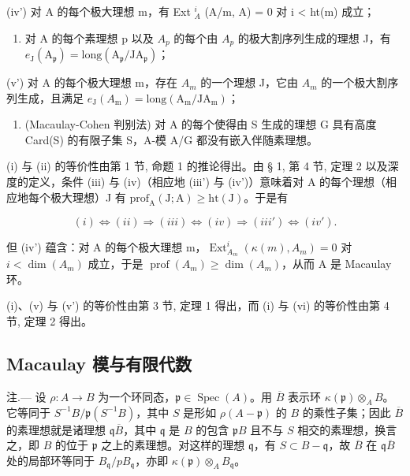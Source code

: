 (iv') 对 A 的每个极大理想 m，有 Ext \(_{A}^{i}\) (A/m, A) = 0 对 i \textless{} ht(m) 成立；

\begin{enumerate}
\def\labelenumi{(\alph{enumi})}
\setcounter{enumi}{21}
\tightlist
\item
  对 A 的每个素理想 p 以及 \(A_{p}\) 的每个由 \(A_{p}\) 的极大割序列生成的理想 J，有 \(e_{\mathrm{J}}(\mathrm{A}_{\mathfrak{p}})=\mathrm{long}(\mathrm{A}_{\mathfrak{p}}/\mathrm{JA}_{\mathfrak{p}})\)；
\end{enumerate}

(v') 对 A 的每个极大理想 m，存在 \(A_{m}\) 的一个理想 J，它由 \(A_{m}\) 的一个极大割序列生成，且满足 \(e_{\mathrm{J}}(A_{\mathrm{m}})=\mathrm{long}(\mathrm{A}_{\mathrm{m}}/\mathrm{JA}_{\mathrm{m}})\)；

\begin{enumerate}
\def\labelenumi{(\roman{enumi})}
\setcounter{enumi}{5}
\tightlist
\item
  (Macaulay-Cohen 判别法) 对 A 的每个使得由 S 生成的理想 G 具有高度 Card(S) 的有限子集 S，A-模 A/G 都没有嵌入伴随素理想。
\end{enumerate}

(i) 与 (ii) 的等价性由第 1 节, 命题 1 的推论得出。由 § 1, 第 4 节, 定理 2 以及深度的定义，条件 (iii) 与 (iv)（相应地 (iii') 与 (iv')）意味着对 A 的每个理想（相应地每个极大理想）J 有 \(\mathrm{prof}_{\mathrm{A}}(\mathrm{J};\mathrm{A})\geqslant \mathrm{ht}(\mathrm{J})\)。于是有

\[
(i) \Leftrightarrow (ii) \Rightarrow (iii) \Leftrightarrow (iv) \Rightarrow (iii') \Leftrightarrow (iv').
\]

但 (iv') 蕴含：对 A 的每个极大理想 m，\(\operatorname{Ext}_{A_{m}}^{i}(\kappa(m), A_{m}) = 0\) 对 \(i < \dim(A_{m})\) 成立，于是 \(\operatorname{prof}(A_{m}) \geqslant \dim(A_{m})\)，从而 A 是 Macaulay 环。

(i)、(v) 与 (v') 的等价性由第 3 节, 定理 1 得出，而 (i) 与 (vi) 的等价性由第 4 节, 定理 2 得出。

\subsection{Macaulay 模与有限代数}

注.--- 设 \(\rho: A \to B\) 为一个环同态，\(\mathfrak{p} \in \operatorname{Spec}(A)\)。用 \(\overline{B}\) 表示环 \(\kappa(\mathfrak{p}) \otimes_{A} B\)。它等同于 \(S^{-1}B/\mathfrak{p}(S^{-1}B)\)，其中 \(S\) 是形如 \(\rho(A - \mathfrak{p})\) 的 \(B\) 的乘性子集；因此 \(\overline{B}\) 的素理想就是诸理想 \(\mathfrak{q}\overline{B}\)，其中 \(\mathfrak{q}\) 是 \(B\) 的包含 \(\mathfrak{p}B\) 且不与 \(S\) 相交的素理想，换言之，即 \(B\) 的位于 \(\mathfrak{p}\) 之上的素理想。对这样的理想 \(\mathfrak{q}\)，有 \(S \subset B - \mathfrak{q}\)，故 \(\overline{B}\) 在 \(\mathfrak{q}\overline{B}\) 处的局部环等同于 \(B_{\mathfrak{q}}/pB_{\mathfrak{q}}\)，亦即 \(\kappa(\mathfrak{p}) \otimes_{A} B_{\mathfrak{q}}\)。

